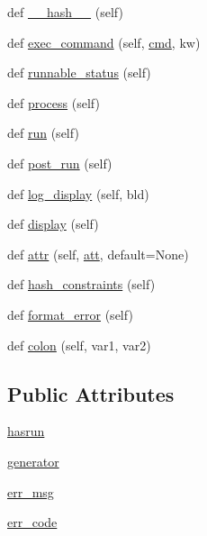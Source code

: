 \begin{DoxyCompactItemize}
def \hyperlink{classwaflib_1_1_task_1_1_task_base_a5e02f89716bcd37b2490adc0861c4bdd}{\+\_\+\+\_\+hash\+\_\+\+\_\+} (self)
\item 
def \hyperlink{classwaflib_1_1_task_1_1_task_base_a6326ff82d67a2b629c8d78b95cb8fec6}{exec\+\_\+command} (self, \hyperlink{sndfile__play_8m_adfc5ba7e22f5e4a6221c12a70503bef3}{cmd}, kw)
\item 
def \hyperlink{classwaflib_1_1_task_1_1_task_base_a10c4597d9085bd1680f9b3eb28e23899}{runnable\+\_\+status} (self)
\item 
def \hyperlink{classwaflib_1_1_task_1_1_task_base_ae5e951a187c8d09c31960bbcf76fad25}{process} (self)
\item 
def \hyperlink{classwaflib_1_1_task_1_1_task_base_ae549bc1a80fd94cc94fd1e764c76895c}{run} (self)
\item 
def \hyperlink{classwaflib_1_1_task_1_1_task_base_a21b09d3f18df76e1d8b0719f321ea3bd}{post\+\_\+run} (self)
\item 
def \hyperlink{classwaflib_1_1_task_1_1_task_base_adf380fd031fc987f4dcd54e1f70420a7}{log\+\_\+display} (self, bld)
\item 
def \hyperlink{classwaflib_1_1_task_1_1_task_base_a838316cf55ac50fab2ae0e8771917e74}{display} (self)
\item 
def \hyperlink{classwaflib_1_1_task_1_1_task_base_a8ead2ec09545f4e9e27d6b40f9f80eaa}{attr} (self, \hyperlink{filters_8h_a6cbe32dd86cefd1a8b182b3ee652e9bf}{att}, default=None)
\item 
def \hyperlink{classwaflib_1_1_task_1_1_task_base_ad4f2583a59ff62565735490154826033}{hash\+\_\+constraints} (self)
\item 
def \hyperlink{classwaflib_1_1_task_1_1_task_base_a321e667402035aa56626ee6f7b3b8223}{format\+\_\+error} (self)
\item 
def \hyperlink{classwaflib_1_1_task_1_1_task_base_ae9648ec691e059291a79f38ef6ee12cc}{colon} (self, var1, var2)
\end{DoxyCompactItemize}
\subsection*{Public Attributes}
\begin{DoxyCompactItemize}
\item 
\hyperlink{classwaflib_1_1_task_1_1_task_base_ab77ee26f4397ba7947fedd63a285b0cf}{hasrun}
\item 
\hyperlink{classwaflib_1_1_task_1_1_task_base_ab2845bbbc20cc2212baf138df4f10e9a}{generator}
\item 
\hyperlink{classwaflib_1_1_task_1_1_task_base_a6076a4b9edbad72479b2b98ab064d536}{err\+\_\+msg}
\item 
\hyperlink{classwaflib_1_1_task_1_1_task_base_a23814f6cff42ad3192598255a871a1bb}{err\+\_\+code}
\end{DoxyCompactItemize}
